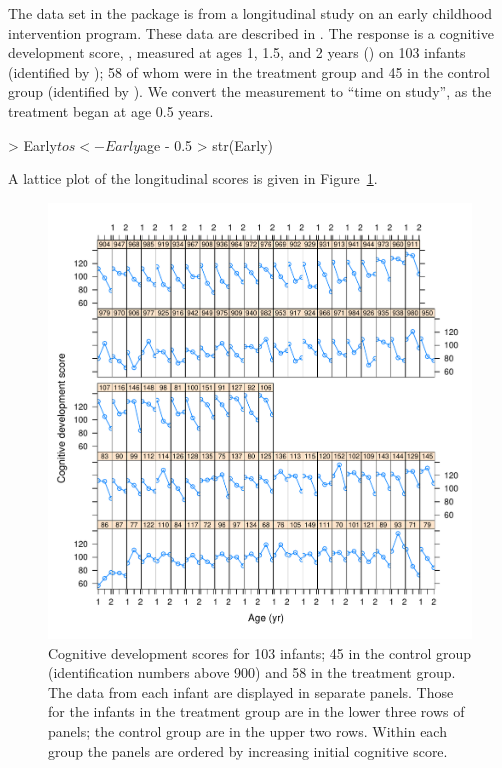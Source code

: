 \documentclass[12pt]{article}
\begin{document}
The  data set in the  package is from a
longitudinal study on an early childhood intervention program.  These
data are described in \citet[ch.~3]{Sing:Will:2003}.  The response is
a cognitive development score, , measured at ages 1, 1.5,
and 2 years () on 103 infants (identified by ); 58
of whom were in the treatment group and 45 in the control group
(identified by ).  We convert the  measurement to
``time on study'',  as the treatment began at age 0.5 years.
\begin{Schunk}
\begin{Sinput}
> Early$tos <- Early$age - 0.5
> str(Early)
\end{Sinput}
\end{Schunk}
A lattice plot of the longitudinal scores is given in Figure~\ref{fig:EarlyData}.
\begin{figure}[tbp]
  \centering
  \includegraphics[width=\textwidth]{figs/Example-EarlyData}
  \caption[Cognitive development scores]{Cognitive development scores
    for 103 infants; 45 in the control group (identification numbers
    above 900) and 58 in the treatment group. The data from 
    each infant are displayed in separate panels. Those for the
    infants in the treatment group are in the lower three rows of
    panels; the control group are in the upper two rows.  Within each
    group the panels are ordered by increasing initial cognitive
    score.}
  \label{fig:EarlyData}
\end{figure}
\end{document}
